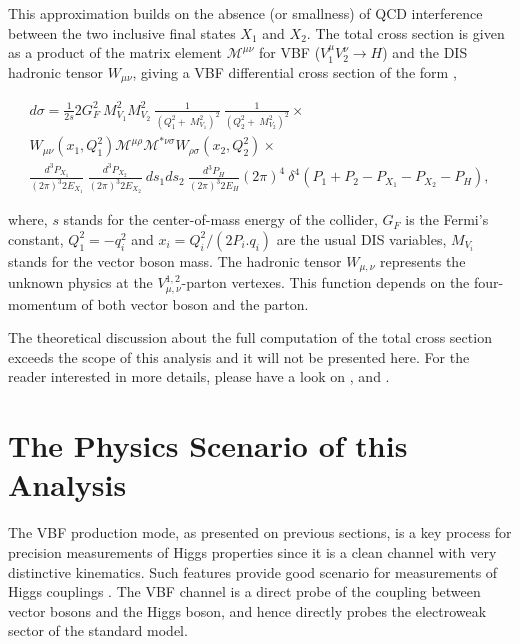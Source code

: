 This approximation builds on the absence (or smallness) of QCD interference between the two inclusive final states $X_{1}$ and $X_{2}$. The total cross section is given as a product of the matrix element $\mathcal{M}^{\mu\nu}$ for VBF ($V_{1}^{\mu}V_{2}^{\nu} \rightarrow H$) and the DIS hadronic tensor $W_{\mu\nu}$, giving a VBF differential cross section of the form \cite{bib:PhysRevLett105-011801-2010,bib:PhysRevLett69-3274-1992},

\begin{eqnarray}
\nonumber
d\sigma = \frac{1}{2s}2G_{F}^{2}~M_{V_{1}}^{2}M_{V_{2}}^{2}~\frac{1}{(Q_{1}^{2}+~M_{V_{1}}^{2})^{2}}~\frac{1}{(Q_{2}^{2}+~M_{V_{2}}^{2})^{2}}\times\\
\nonumber
W_{\mu\nu}(x_{1},Q_{1}^{2})\mathcal{M}^{\mu\rho}\mathcal{M}^{*\nu\sigma}W_{\rho\sigma}(x_{2},Q_{2}^{2})\times\\ \frac{d^{3}P_{X_{1}}}{(2\pi)^{3}2E_{X_{1}}}~\frac{d^{3}P_{X_{2}}}{(2\pi)^{3}2E_{X_{2}}}~ds_{1}ds_{2}~\frac{d^{3}P_{H}}{(2\pi)^{3}2E_{H}}
(2\pi)^{4}~\delta^{4}(P_{1}+P_{2}-P_{X_{1}}-P_{X_{2}}-P_{H}),
\label{eq:vbf_dis_differential_XS}
\end{eqnarray}

where, $s$ stands for the center-of-mass energy of the collider, $G_{F}$ is the Fermi's constant, $Q_{1}^{2} = -q_{i}^{2}$ and $x_{i} = Q_{i}^{2}/(2P_{i}.q_{i})$ are the usual DIS variables, $M_{V_{i}}$ stands for the vector boson mass. The hadronic tensor $W_{\mu,\nu}$ represents the unknown physics at the $V_{\mu,\nu}^{1,2}$-parton vertexes. This function depends on the four-momentum of both vector boson and the parton. 

The theoretical discussion about the full computation of the total cross section exceeds the scope of this analysis and it will not be presented here. For the reader interested in more details, please have a look on \cite{bib:PhysRep457-1-2005}, \cite{bib:PhysRevLett69-3274-1992} and \cite{bib:PhysRevLett105-011801-2010}.


\section{The Physics Scenario of this Analysis}
The VBF production mode, as presented on previous sections, is a key process for precision measurements of Higgs properties since it is a clean channel with very distinctive kinematics. Such features provide good scenario for measurements of Higgs couplings \cite{bib:PhysRevD62_013009_2000}. The VBF channel is a direct probe of the coupling between vector bosons and the Higgs boson, and hence directly probes the electroweak sector of the standard model.

